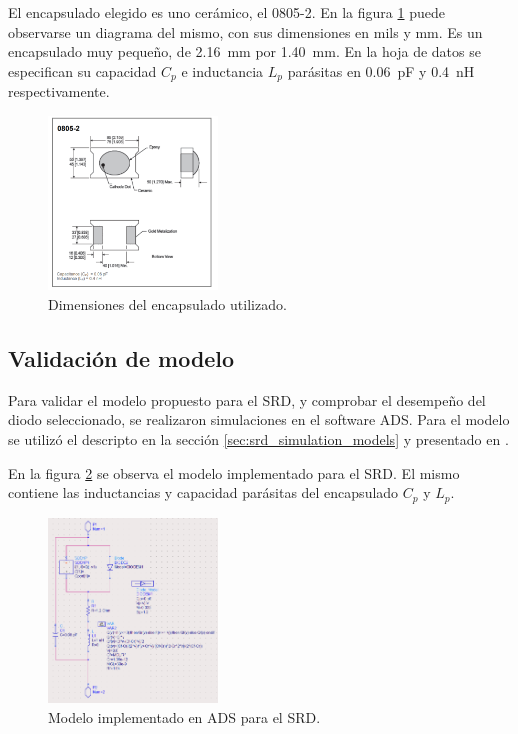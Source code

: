 El encapsulado elegido es uno cerámico, el 0805-2. En la figura
\ref{fig:srd_0805_outline} puede observarse un diagrama del mismo, con sus
dimensiones en mils y mm. Es un encapsulado muy pequeño, de
\qty{2.16}{\milli\meter} por \qty{1.40}{\milli\meter}. En la hoja de datos se
especifican su capacidad $C_p$ e inductancia $L_p$ parásitas en
\qty{0.06}{\pico\farad} y \qty{0.4}{\nano\henry} respectivamente.

\begin{figure}[t]
  \centering
    \includegraphics[width=0.4\textwidth]{images/srd_0805_outline.jpg}
    \caption{Dimensiones del encapsulado utilizado.}
    \label{fig:srd_0805_outline}
\end{figure}

\subsection{Validación de modelo}

Para validar el modelo propuesto para el SRD, y comprobar el desempeño del diodo
seleccionado, se realizaron simulaciones en el software ADS. Para el modelo se
utilizó el descripto en la sección \ref{sec:srd_simulation_models} y presentado
en \cite{zhang1995}.

En la figura \ref{fig:srd_model_ads} se observa el modelo implementado para el
SRD. El mismo contiene las inductancias y capacidad parásitas del encapsulado
$C_p$ y $L_p$.

\begin{figure}[t]
  \centering
    \includegraphics[width=0.4\textwidth]{images/srd_model_ads.jpg}
    \caption{Modelo implementado en ADS para el SRD.}
    \label{fig:srd_model_ads}
\end{figure}


